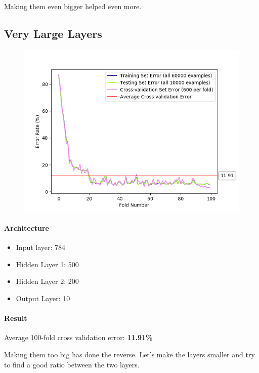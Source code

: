 \documentclass[11pt]{article}
\makeatletter
\def\maxwidth{\ifdim\Gin@nat@width>\linewidth\linewidth
    \else\Gin@nat@width\fi}
\let\Oldincludegraphics\includegraphics
\renewcommand{\includegraphics}[1]{\Oldincludegraphics[width=.8\maxwidth]{#1}}
\providecommand{\tightlist}{%
      \setlength{\itemsep}{0pt}\setlength{\parskip}{0pt}}
\makeatother
\begin{document}
Making them even bigger helped even more.
\pagebreak

\subsection{Very Large Layers}\label{very-large-layers}

\begin{figure}[htbp]
\centering
\includegraphics{plots/ff-layersize-500-200.png}
\end{figure}

\paragraph{Architecture}\label{architecture-3}

\begin{itemize}
\tightlist
\item
  Input layer: 784
\item
  Hidden Layer 1: 500
\item
  Hidden Layer 2: 200
\item
  Output Layer: 10
\end{itemize}

\paragraph{Result}\label{result-3}

Average 100-fold cross validation error: \textbf{11.91\%}

Making them too big has done the reverse. Let's make the layers smaller
and try to find a good ratio between the two layers.
\end{document}
